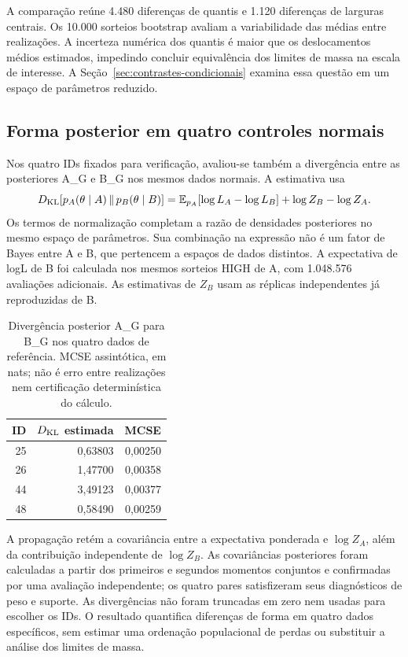 A comparação reúne 4.480 diferenças de quantis e 1.120 diferenças de
larguras centrais. Os 10.000 sorteios bootstrap avaliam a variabilidade
das médias entre realizações. A incerteza numérica dos quantis é maior
que os deslocamentos médios estimados, impedindo concluir equivalência
dos limites de massa na escala de interesse. A Seção~\ref{sec:contrastes-condicionais}
examina essa questão em um espaço de parâmetros reduzido.

\subsection{Forma posterior em quatro controles normais}
\label{sec:comp-KL-posterior}

Nos quatro IDs fixados para verificação, avaliou-se também a divergência
entre as posteriores A\_G e B\_G nos mesmos dados normais. A estimativa usa
\begin{equation}
 D_{\rm KL}\!\left[p_A(\theta\mid A)\,\Vert\,p_B(\theta\mid B)\right]
 =\mathbb E_{p_A}[\log L_A-\log L_B]+\log Z_B-\log Z_A .
 \label{eq:comp-KL-posterior}
\end{equation}
Os termos de normalização completam a razão de densidades posteriores
no mesmo espaço de parâmetros. Sua combinação na expressão não é um
fator de Bayes entre A e B, que pertencem a espaços de dados distintos.
A expectativa de logL de B foi calculada nos mesmos sorteios HIGH de A,
com 1.048.576 avaliações adicionais. As estimativas de $Z_B$ usam as
réplicas independentes já reproduzidas de B.

\begin{table}[htbp]
\centering\small
\caption{Divergência posterior A\_G para B\_G nos quatro dados de
referência. MCSE assintótica, em nats; não é erro entre realizações
nem certificação determinística do cálculo.}
\label{tab:comp-KL-posterior}
\begin{tabular}{rrr}
\toprule
ID & $D_{\rm KL}$ estimada & MCSE\\
\midrule
25 & 0,63803 & 0,00250\\
26 & 1,47700 & 0,00358\\
44 & 3,49123 & 0,00377\\
48 & 0,58490 & 0,00259\\
\bottomrule
\end{tabular}
\end{table}

A propagação retém a covariância entre a expectativa ponderada e
$\log Z_A$, além da contribuição independente de $\log Z_B$.
As covariâncias posteriores foram calculadas a partir dos primeiros e
segundos momentos conjuntos e confirmadas por uma avaliação independente;
os quatro pares satisfizeram seus diagnósticos de peso e suporte.
As divergências não foram truncadas em zero nem usadas para escolher
os IDs. O resultado quantifica diferenças de forma em quatro dados
específicos, sem estimar uma ordenação populacional de perdas ou
substituir a análise dos limites de massa.

